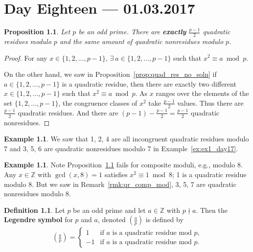 \documentclass{amsbook}
\theoremstyle{plain}
\newtheorem{proposition}[theorem]{Proposition}
\theoremstyle{definition}
\newtheorem{definition}[theorem]{Definition}
\newtheorem{example}[theorem]{Example}
\theoremstyle{remark}
\numberwithin{equation}{chapter}
\numberwithin{figure}{chapter}
\newcommand{\Z}{\mathbb{Z}}
\begin{document}
\chapter[Lecture Eighteen]{Day Eighteen \hfill {\footnotesize \rm --- 01.03.2017}}

\begin{proposition}\label{prop:prop1_day18}
  Let $p$ be an odd prime. There are \textbf{exactly} $\frac{p-1}2$ quadratic residues modulo $p$ and the same amount of quadratic nonresidues modulo $p$.
\end{proposition}
\begin{proof}
  For any $x \in \{ 1, 2, \ldots, p-1 \}$, $\exists~a \in \{ 1, 2, \ldots, p-1 \}$ such that $x^2 \equiv a \bmod p$.

  On the other hand, we saw in Proposition~\ref{prop:quad_res_no_soln} if $a \in \{ 1, 2, \ldots, p-1 \}$ is a quadratic residue, then there are exactly two different $x \in \{ 1, 2, \ldots, p-1 \}$ such that $x^2 \equiv a \bmod p$. As $x$ ranges over the elements of the set $\{ 1, 2, \ldots, p-1 \}$, the congruence classes of $x^2$ take $\frac{p-1}2$ values. Thus there are $\frac{p-1}2$ quadratic residues. And there are $(p-1) - \frac{p-1}2 = \frac{p-1}2$ quadratic nonresidues.
\end{proof}
\begin{example}
  We saw that 1, 2, 4 are all incongruent quadratic residues modulo 7 and 3, 5, 6 are quadratic nonresidues modulo 7 in Example~\ref{ex:ex1_day17}.
\end{example}
\begin{example}
  Note Proposition~\ref{prop:prop1_day18} fails for composite moduli, e.g., modulo 8. Any $x \in \Z$ with $\gcd (x, 8) = 1$ satisfies $x^2 \equiv 1 \bmod 8$; 1 is a quadratic residue modulo 8. But we saw in Remark~\ref{rmk:qr_comp_mod}, 3, 5, 7 are quadratic nonresidues modulo 8.
\end{example}
\begin{definition}\label{def:legendre_sym}
  Let $p$ be an odd prime and let $a \in \Z$ with $p \nmid a$. Then the \textbf{Legendre symbol} for $p$ and $a$, denoted $\left( \frac{a}p \right)$ is defined by
  \begin{align}
    \left( \frac{a}p \right) = \left\{ \begin{array}{rl}
                                         1 & \text{if $a$ is a quadratic residue mod $p$,} \\[2mm]
                                         -1 & \text{if $a$ is a quadratic residue mod $p$.}
                                       \end{array} \right.
  \end{align}                                               
\end{definition}
\end{document}
